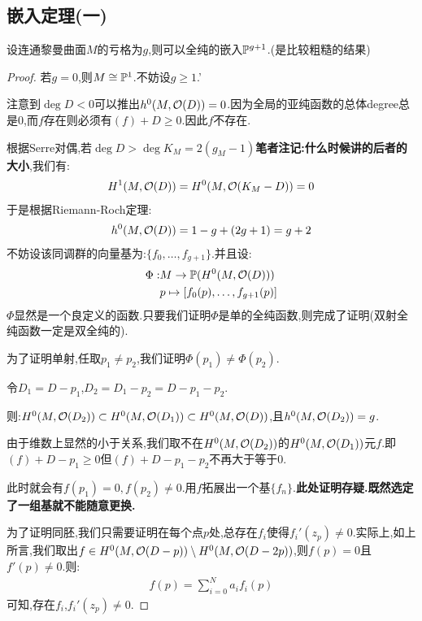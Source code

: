\subsection*{嵌入定理(一)}
\begin{theorem}
	设连通黎曼曲面$M$的亏格为$g$,则可以全纯的嵌入$\mathbb{P}^{g+1}$.(是比较粗糙的结果)
\end{theorem}
\begin{proof}
	若$g=0$,则$M\cong \mathbb{P}^1$.不妨设$g\geq 1$.'

   注意到$\deg D<0$可以推出$h^0(M,\mathcal{O}(D))=0$.因为全局的亚纯函数的总体degree总是$0$,而$f$存在则必须有$(f)+D\geq 0$.因此$f$不存在.

   根据Serre对偶,若$\deg D>\deg K_M=2(g_M-1)$\textbf{笔者注记:什么时候讲的后者的大小},我们有:
   \begin{align*}
	H^1(M,\mathcal{O}(D))=H^0(M,\mathcal{O}(K_M-D))=0
   \end{align*}
   于是根据Riemann-Roch定理:
   \begin{align*}
	 h^0(M,\mathcal{O}(D))=1-g+(2g+1)=g+2
   \end{align*}
   不妨设该同调群的向量基为:$\{f_0,\dots,f_{g+1}\}$.并且设:
   \begin{align*}
	\Phi:&M \to \mathbb{P}(H^0(M,\mathcal{O}(D)))\\
	    & p \mapsto [f_0(p),\dots,f_{g+1}(p)]
    \end{align*}
	$\Phi$显然是一个良定义的函数.只要我们证明$\Phi$是单的全纯函数,则完成了证明(双射全纯函数一定是双全纯的).

	为了证明单射,任取$p_1 \neq p_2$,我们证明$\Phi(p_1)
\neq \Phi(p_2)$.

    令$D_1=D-p_1$,$D_2=D_1-p_2=D-p_1-p_2$.

	则:$H^0(M,\mathcal{O}(D_2))\subset H^0(M,\mathcal{O}(D_1)) \subset H^0(M,\mathcal{O}(D))$,且$h^0(M,\mathcal{O}(D_2))=g$.

	由于维数上显然的小于关系,我们取不在$H^0(M,\mathcal{O}(D_2))$的$H^0(M,\mathcal{O}(D_1))$元$f$.即$(f)+D-p_1\geq 0$但$(f)+D-p_1-p_2$不再大于等于$0$.

	此时就会有$f(p_1)=0,f(p_2)\neq 0$.用$f$拓展出一个基$\{f_n\}$.\textbf{此处证明存疑.既然选定了一组基就不能随意更换.}

	为了证明同胚,我们只需要证明在每个点$p$处,总存在$f_i$使得$f_i'(z_{p})\neq 0$.实际上,如上所言,我们取出$f \in H^0(M,\mathcal{O}(D-p)) \setminus H^0(M,\mathcal{O}(D-2p))$,则$f(p)=0$且$f'(p)\neq 0$.则:
	\begin{align*}
		f(p)=\sum_{i=0}^N a_i f_i(p)
	\end{align*}
	可知,存在$f_i$,$f_i'(z_p)\neq 0$.

\end{proof}
